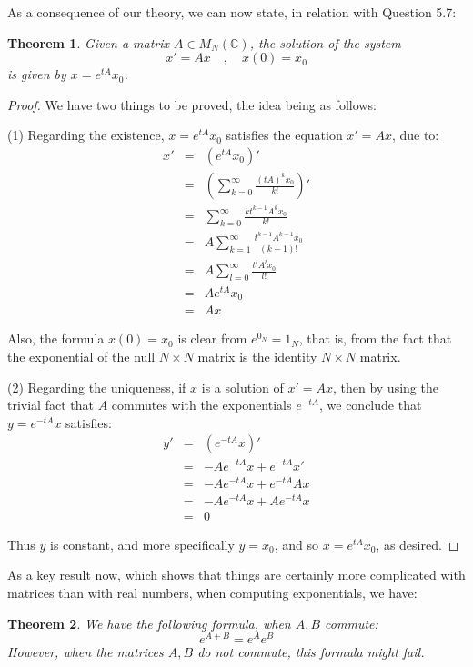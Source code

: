 \documentclass[12pt]{amsbook}
\newtheorem{theorem}{Theorem}[chapter]
\begin{document}
As a consequence of our theory, we can now state, in relation with Question 5.7:

\begin{theorem}
Given a matrix $A\in M_N(\mathbb C)$, the solution of the system 
$$x'=Ax\quad,\quad x(0)=x_0$$
is given by $x=e^{tA}x_0$.
\end{theorem}

\begin{proof}
We have two things to be proved, the idea being as follows:

\medskip

(1) Regarding the existence, $x=e^{tA}x_0$ satisfies the equation $x'=Ax$, due to:
\begin{eqnarray*}
x'
&=&(e^{tA}x_0)'\\
&=&\left(\sum_{k=0}^\infty\frac{(tA)^kx_0}{k!}\right)'\\
&=&\sum_{k=0}^\infty\frac{kt^{k-1}A^kx_0}{k!}\\
&=&A\sum_{k=1}^\infty\frac{t^{k-1}A^{k-1}x_0}{(k-1)!}\\
&=&A\sum_{l=0}^\infty\frac{t^lA^lx_0}{l!}\\
&=&Ae^{tA}x_0\\
&=&Ax
\end{eqnarray*}

Also, the formula $x(0)=x_0$ is clear from $e^{0_N}=1_N$, that is, from the fact that the exponential of the null $N\times N$ matrix is the identity $N\times N$ matrix.

\medskip

(2) Regarding the uniqueness, if $x$ is a solution of $x'=Ax$, then by using the trivial fact that $A$ commutes with the exponentials $e^{-tA}$, we conclude that $y=e^{-tA}x$ satisfies:
\begin{eqnarray*}
y'
&=&(e^{-tA}x)'\\
&=&-Ae^{-tA}x+e^{-tA}x'\\
&=&-Ae^{-tA}x+e^{-tA}Ax\\
&=&-Ae^{-tA}x+Ae^{-tA}x\\
&=&0
\end{eqnarray*}

Thus $y$ is constant, and more specifically $y=x_0$, and so $x=e^{tA}x_0$, as desired.
\end{proof}

As a key result now, which shows that things are certainly more complicated with matrices than with real numbers, when computing exponentials, we have:

\begin{theorem}
We have the following formula, when $A,B$ commute:
$$e^{A+B}=e^Ae^B$$
However, when the matrices $A,B$ do not commute, this formula might fail.
\end{theorem}
\end{document}
